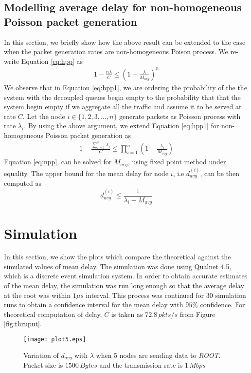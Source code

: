 \documentclass[10pt, conference, compsocconf]{IEEEtran}
\begin{document}
\subsection{Modelling average delay for non-homogeneous Poisson packet generation}
In this section, we briefly show how the above result can be extended to the case when the packet generation rates are non-homogeneous Poison process. We re-write Equation \ref{eq:hpp} as
\begin{eqnarray} \label{eq:hpp1}
1 - \frac{n\lambda}{C}  \leq \left(1 - \frac{\lambda}{M_{avg}} \right)^n 
\end{eqnarray} 
We observe that in Equation \eqref{eq:hpp1}, we are ordering the probability of the the system with the decoupled queues begin empty to the probability that that the system begin empty if we aggregate all the traffic and assume it to be served at rate $C$. Let the node $i \in \{1,2,3,...,n \}$ generate packets as Poisson process with rate $\lambda_i$. By using the above argument, we extend Equation \eqref{eq:hpp1} for non-homogeneous Poisson packet generation as
\begin{eqnarray} \label{eq:npp}
1 - \frac{\displaystyle \sum^{n}_{i=1} \lambda_i}{C}  \leq \prod^n_{i=1} \left(1 - \frac{\lambda_i}{M_{avg}} \right) 
\end{eqnarray}
Equation \ref{eq:npp}, can be solved for $M_{avg}$, using fixed point method under equality. The upper bound for the mean delay for node $i$, i.e $d^{(i)}_{avg}$, can be then computed as
$$d^{(i)}_{avg} \leq \frac{1}{\lambda_i - M_{avg}}$$

\section{\large{Simulation}}
\label{sim}
In this section, we show the plots which compare the theoretical against the simulated values of mean delay. The simulation was done using Qualnet 4.5, which is a discrete event simulation system. In order to obtain accurate estimates of the mean delay, the simulation was run long enough so that the average delay at the root was within $1 \mu s$ interval. This process was continued for $30$ simulation runs to obtain a confidence interval for the mean delay with $95\%$ confidence. For theoretical computation of delay, $C$ is taken as $72.8\, pkts/s$ from Figure \ref{fig:thruput}.

\begin{figure}[!h]
\centering
\texttt{[image: plot5.eps]}
\caption{Variation of $d_{avg}$ with $\lambda$ when 5 nodes are sending data to \textit{ROOT}. Packet size is $1500\,Bytes$ and the transmission rate is $1\,Mbps$ }
\label{fig:plot5}
\end{figure}
\end{document}
